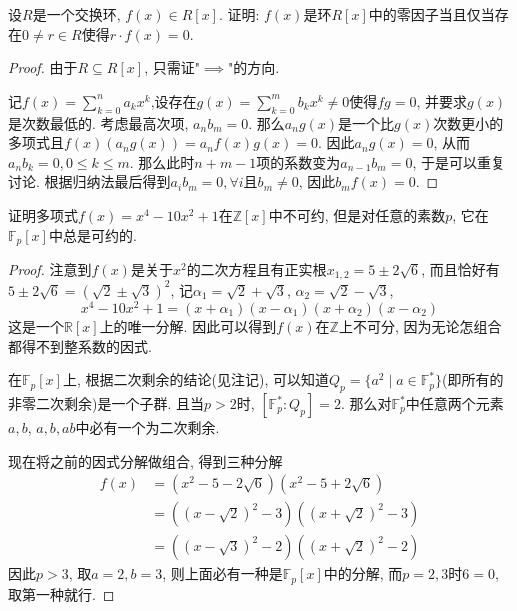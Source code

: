 \begin{problem}
    设$R$是一个交换环, $f(x) \in R[x]$. 证明: $f(x)$是环$R[x]$中的零因子当且仅当存在$0 \neq r \in R$使得$r \cdot f(x) = 0$.
\end{problem}

\begin{proof}
    由于$R \subseteq R[x]$, 只需证"$\implies$"的方向.

    记$f(x) = \sum_{k = 0}^{n} a_kx^k$,设存在$g(x) = \sum_{k = 0}^{m} b_kx^k \neq 0$使得$fg = 0$, 并要求$g(x)$是次数最低的. 考虑最高次项, $a_nb_m = 0$. 那么$a_ng(x)$是一个比$g(x)$次数更小的多项式且$f(x)(a_ng(x)) = a_nf(x)g(x) = 0$. 因此$a_ng(x) = 0$, 从而$a_nb_k = 0, 0 \leqslant k \leqslant m$. 那么此时$n + m - 1$项的系数变为$a_{n - 1}b_m = 0$, 于是可以重复讨论. 根据归纳法最后得到$a_ib_m = 0, \forall i$且$b_m \neq 0$, 因此$b_mf(x) = 0$.
\end{proof}

\begin{problem}
    证明多项式$f(x) = x^4 - 10x^2 + 1$在$\mathbb{Z}[x]$中不可约, 但是对任意的素数$p$, 它在$\mathbb{F}_p[x]$中总是可约的.
\end{problem}

\begin{proof}
    注意到$f(x)$是关于$x^2$的二次方程且有正实根$x_{1,2} =  5 \pm 2\sqrt{6}$, 而且恰好有$5 \pm 2\sqrt{6} = (\sqrt{2} \pm \sqrt{3})^2$, 记$\alpha_1 = \sqrt{2} + \sqrt{3}$, $\alpha_2 = \sqrt{2} - \sqrt{3}$,
    \[
        x^4 - 10x^2 + 1 = (x + \alpha_1)(x - \alpha_1)(x + \alpha_2)(x - \alpha_2)
    \]
    这是一个$\mathbb{R}[x]$上的唯一分解. 因此可以得到$f(x)$在$\mathbb{Z}$上不可分, 因为无论怎组合都得不到整系数的因式.

    在$\mathbb{F}_p[x]$上, 根据二次剩余的结论(见注记), 可以知道$Q_p = \{a^2 \mid a \in \mathbb{F}_p^*\}$(即所有的非零二次剩余)是一个子群. 且当$p > 2$时, $[\mathbb{F}_p^*:Q_p] = 2$. 那么对$\mathbb{F}_p^*$中任意两个元素$a, b$, $a, b, ab$中必有一个为二次剩余.

    现在将之前的因式分解做组合, 得到三种分解
    \[
    \begin{aligned}
        f(x) &= (x^2 - 5 - 2\sqrt{6})(x^2 - 5 + 2\sqrt{6})\\
        &= ((x - \sqrt{2})^2 - 3)((x + \sqrt{2})^2 - 3)\\
        &= ((x - \sqrt{3})^2 - 2)((x + \sqrt{2})^2 - 2)
    \end{aligned}
    \]
    因此$p > 3$, 取$a = 2, b = 3$, 则上面必有一种是$\mathbb{F}_p[x]$中的分解, 而$p = 2, 3$时$6 = 0$, 取第一种就行.
\end{proof}

